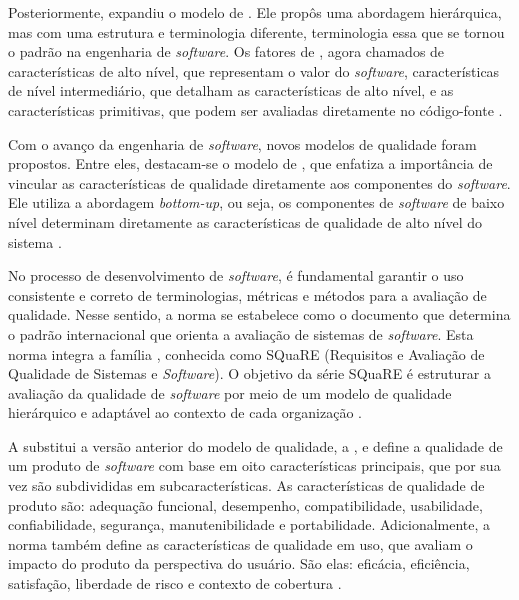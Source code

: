 Posteriormente,  expandiu o modelo de . Ele propôs uma abordagem hierárquica, mas com uma estrutura e terminologia diferente, terminologia essa que se tornou o padrão na engenharia de \textit{software}. Os fatores de , agora chamados de características de alto nível, que representam o valor do \textit{software}, características de nível intermediário, que detalham as características de alto nível, e as características primitivas, que podem ser avaliadas diretamente no código-fonte \cite{Boehm1978}.

Com o avanço da engenharia de \textit{software}, novos modelos de qualidade foram propostos. Entre eles, destacam-se o modelo de , que enfatiza a importância de vincular as características de qualidade diretamente aos componentes do \textit{software}. Ele utiliza a abordagem \textit{bottom-up}, ou seja, os componentes de \textit{software} de baixo nível determinam diretamente as características de qualidade de alto nível do sistema \cite{Dromey:1995:MSP:205302.205311}.

No processo de desenvolvimento de \textit{software}, é fundamental garantir o uso consistente e correto de terminologias, métricas e métodos para a avaliação de qualidade. Nesse sentido, a norma  se estabelece como o documento que determina o padrão internacional que orienta a avaliação de sistemas de \textit{software}.
Esta norma integra a família , conhecida como SQuaRE (Requisitos e Avaliação de Qualidade de Sistemas e \textit{Software}). O objetivo da série SQuaRE é estruturar a avaliação da qualidade de \textit{software} por meio de um modelo de qualidade hierárquico e adaptável ao contexto de cada organização \cite{ISO25010}. 



A  substitui a versão anterior do modelo de qualidade, a , e define a qualidade de um produto de \textit{software} com base em oito características principais, que por sua vez são subdivididas em subcaracterísticas. As características de qualidade de produto são: adequação funcional, desempenho, compatibilidade, usabilidade, confiabilidade, segurança, manutenibilidade e portabilidade. 
Adicionalmente, a norma também define as características de qualidade em uso, que avaliam o impacto do produto da perspectiva do usuário. São elas: eficácia, eficiência, satisfação, liberdade de risco e contexto de cobertura \cite{ISOIEC25010}.

